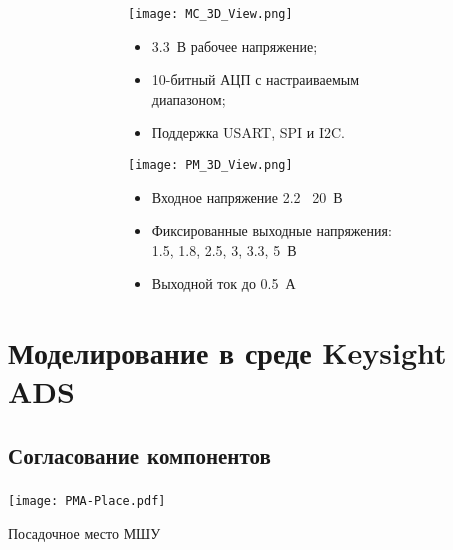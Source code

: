 \documentclass[c]{beamer}  %
\begin{document}
	\begin{frame}[shrink=20]
		\frametitle{\insertsection}
		\framesubtitle{\insertsubsection}
		\begin{center}
			\begin{figure}
				\begin{subfigure}{0.5\textwidth}
					\begin{subfigure}[t]{0.95\textwidth}
						\texttt{[image: MC\_3D\_View.png]}
					\end{subfigure}
					
					\begin{subfigure}[b]{0.95\textwidth}
						\begin{itemize}
							\item 3.3~В рабочее напряжение;
							\item 10-битный АЦП с настраиваемым диапазоном;
							\item Поддержка USART, SPI и I2C.
						\end{itemize}
					\end{subfigure}
				\end{subfigure}%
				\begin{subfigure}{0.5\textwidth}
					\begin{subfigure}[t]{0.95\textwidth}
						\texttt{[image: PM\_3D\_View.png]}
					\end{subfigure}
					
					\begin{subfigure}[b]{0.95\textwidth}
						\begin{itemize}
							\item Входное напряжение 2.2 \textdiv\  20~В 
							\item Фиксированные выходные напряжения: 1.5, 1.8, 2.5, 3, 3.3, 5~В
							\item Выходной ток до 0.5~А
						\end{itemize}
					\end{subfigure}
				\end{subfigure}
			\end{figure}
		
		\end{center}
	\end{frame}

\section{Моделирование в среде Keysight ADS}
\subsection{Согласование компонентов}
	\begin{frame}
		\frametitle{\insertsection}
		\framesubtitle{\insertsubsection}
		\centering
		\texttt{[image: PMA-Place.pdf]}
		
		\vfill
		Посадочное место МШУ
		
	\end{frame}
\end{document}
